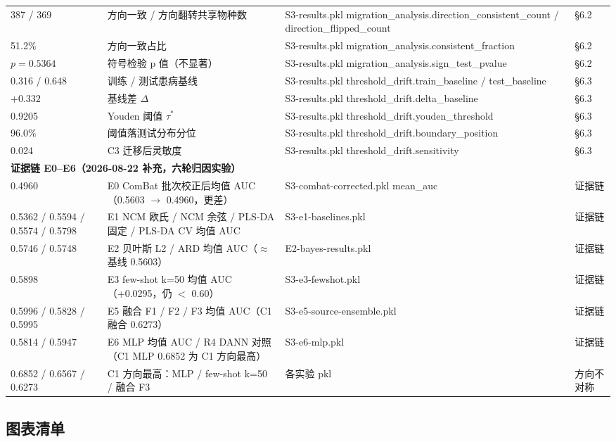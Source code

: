 \documentclass{article}   %
\begin{document}
\begin{center}
\begin{tabular}{llll}
387 / 369 & 方向一致 / 方向翻转共享物种数 & S3-results.pkl migration\_analysis.direction\_consistent\_count / direction\_flipped\_count & §6.2 \\
51.2\% & 方向一致占比 & S3-results.pkl migration\_analysis.consistent\_fraction & §6.2 \\
$p=0.5364$ & 符号检验 p 值（不显著） & S3-results.pkl migration\_analysis.sign\_test\_pvalue & §6.2 \\
0.316 / 0.648 & 训练 / 测试患病基线 & S3-results.pkl threshold\_drift.train\_baseline / test\_baseline & §6.3 \\
$+0.332$ & 基线差 $\Delta$ & S3-results.pkl threshold\_drift.delta\_baseline & §6.3 \\
0.9205 & Youden 阈值 $\tau^*$ & S3-results.pkl threshold\_drift.youden\_threshold & §6.3 \\
96.0\% & 阈值落测试分布分位 & S3-results.pkl threshold\_drift.boundary\_position & §6.3 \\
0.024 & C3 迁移后灵敏度 & S3-results.pkl threshold\_drift.sensitivity & §6.3 \\
\midrule
\multicolumn{4}{l}{\textbf{证据链 E0--E6（2026-08-22 补充，六轮归因实验）}} \\
0.4960 & E0 ComBat 批次校正后均值 AUC（0.5603 $\to$ 0.4960，更差） & S3-combat-corrected.pkl mean\_auc & 证据链 \\
0.5362 / 0.5594 / 0.5574 / 0.5798 & E1 NCM 欧氏 / NCM 余弦 / PLS-DA 固定 / PLS-DA CV 均值 AUC & S3-e1-baselines.pkl & 证据链 \\
0.5746 / 0.5748 & E2 贝叶斯 L2 / ARD 均值 AUC（$\approx$ 基线 0.5603） & E2-bayes-results.pkl & 证据链 \\
0.5898 & E3 few-shot k=50 均值 AUC（+0.0295，仍 $<$ 0.60） & S3-e3-fewshot.pkl & 证据链 \\
0.5996 / 0.5828 / 0.5995 & E5 融合 F1 / F2 / F3 均值 AUC（C1 融合 0.6273） & S3-e5-source-ensemble.pkl & 证据链 \\
0.5814 / 0.5947 & E6 MLP 均值 AUC / R4 DANN 对照（C1 MLP 0.6852 为 C1 方向最高） & S3-e6-mlp.pkl & 证据链 \\
0.6852 / 0.6567 / 0.6273 & C1 方向最高：MLP / few-shot k=50 / 融合 F3 & 各实验 pkl & 方向不对称 \\
\bottomrule
\end{tabular}
\end{center}

\subsection{图表清单}
\end{document}
